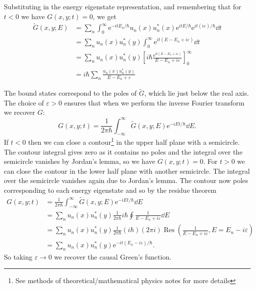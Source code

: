 \documentclass[fleqn]{NotesClass}
\newcommand*{\e}{\mathrm{e}}
\DeclareMathOperator{\Res}{Res}
\begin{document}
    Substituting in the energy eigenstate representation, and remembering that for \(t < 0\) we have \(G(x, y; t) = 0\), we get
    \begin{align}
        \tilde{G}(x, y; E) &= \sum_n \int_{0}^{\infty} \e^{-itE_n/\hbar}u_n(x)u_n^*(x) \e^{itE/\hbar} \e^{it(i\varepsilon)/\hbar} \dd{t}\\
        &= \sum_n u_n(x)u_n^*(y) \int_{0}^{\infty} \e^{it(E - E_n + i\varepsilon)}\dd{t}\\
        &= \sum_n u_n(x)u_n^*(y) \left[ i\hbar \frac{\e^{it(E - E_n + i\varepsilon)}}{E - E_n + i\varepsilon} \right]_{0}^{\infty}\\
        &= i\hbar \sum_n \frac{u_n(x)u_n^*(y)}{E - E_n + \varepsilon}
    \end{align}
    
    The bound states correspond to the poles of \(\tilde{G}\), which lie just below the real axis.
    The choice of \(\varepsilon > 0\) ensures that when we perform the inverse Fourier transform we recover \(G\):
    \begin{equation}
        G(x, y; t) = \frac{1}{2\pi\hbar} \int_{-\infty}^{\infty} \tilde{G}(x, y; E) \e^{-iEt/\hbar} \dd{E}.
    \end{equation}
    If \(t < 0\) then we can close a contour\footnote{See methods of theoretical/mathematical physics notes for more details} in the upper half plane with a semicircle.
    The contour integral gives zero as it contains no poles and the integral over the semicircle vanishes by Jordan's lemma, so we have \(G(x, y; t) = 0\).
    For \(t > 0\) we can close the contour in the lower half plane with another semicircle.
    The integral over the semicircle vanishes again due to Jordan's lemma.
    The contour now poles corresponding to each energy eigenstate and so by the residue theorem
    \begin{align}
        G(x, y; t) &= \frac{1}{2\pi\hbar} \int_{-\infty}^{\infty} \tilde{G}(x, y; E) \e^{-iEt/\hbar} \dd{E}\\
        &= \sum_n u_n(x) u_n^*(y) \frac{1}{2\pi \hbar} i\hbar \oint \frac{1}{E - E_n + i\varepsilon} \dd{E}\\
        &= \sum_n u_n(x) u_n^*(y) \frac{1}{2\pi \hbar} (i\hbar) (2\pi i) \Res\left( \frac{1}{E - E_n + i\varepsilon}, E = E_n - i\varepsilon \right)\\
        &= \sum_n u_n(x) u_n^*(y)\e^{-it(E_n - i\varepsilon)/\hbar}.
    \end{align}
    So taking \(\varepsilon \to 0\) we recover the causal Green's function.
    
\end{document}
